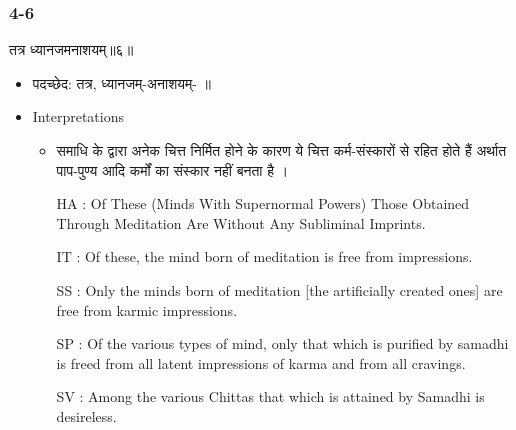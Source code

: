 \begin{frame}[fragile]\frametitle{4-6}
\begin{sanskrit}
तत्र ध्यानजमनाशयम्॥६॥
\end{sanskrit}

	\begin{itemize}
	\item पदच्छेद:  तत्र, ध्यानजम्-अनाशयम्- ॥
	\item Interpretations
		\begin{itemize}	
		\item समाधि के द्वारा अनेक चित्त निर्मित होने के कारण ये चित्त कर्म-संस्कारों से रहित होते हैं अर्थात पाप-पुण्य आदि कर्मों का संस्कार नहीं बनता है ।
		\item [HA]: Of These (Minds With Supernormal Powers) Those Obtained Through Meditation Are Without Any Subliminal Imprints.
		\item [IT]: Of these, the mind born of meditation is free from impressions.
		\item [SS]: Only the minds born of meditation [the artificially created ones] are free from karmic impressions.
		\item [SP]: Of the various types of mind, only that which is purified by samadhi is freed from all latent impressions of karma and from all cravings.
		\item [SV]: Among the various Chittas that which is attained by Samadhi is desireless. 
		\end{itemize}
	\end{itemize}
\end{frame}


